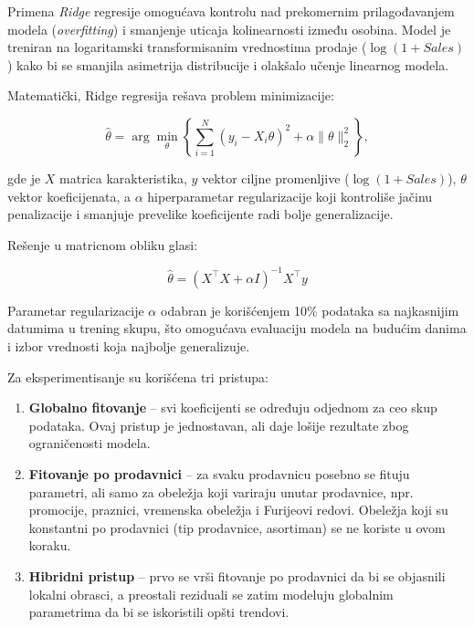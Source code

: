 \documentclass[12pt]{article}
\begin{document}
Primena \textit{Ridge} regresije omogućava kontrolu nad prekomernim prilagođavanjem modela (\textit{overfitting}) i smanjenje uticaja kolinearnosti između osobina.  
Model je treniran na logaritamski transformisanim vrednostima prodaje (\(\log(1+Sales)\)) kako bi se smanjila asimetrija distribucije i olakšalo učenje linearnog modela.  

Matematički, Ridge regresija rešava problem minimizacije:

\begin{equation}
    \hat{\theta} = \arg\min_\theta \left\{ \sum_{i=1}^{N} \left(y_i - X_i \theta \right)^2 + \alpha \|\theta\|_2^2 \right\},
\end{equation}

gde je \(X\) matrica karakteristika, \(y\) vektor ciljne promenljive (\(\log(1+Sales)\)), \(\theta\) vektor koeficijenata, a \(\alpha\) hiperparametar regularizacije koji kontroliše jačinu penalizacije i smanjuje prevelike koeficijente radi bolje generalizacije.

Rešenje u matricnom obliku glasi:

\begin{equation}
    \hat{\theta} = \left(X^\top X + \alpha I\right)^{-1} X^\top y
\end{equation}

Parametar regularizacije \(\alpha\) odabran je korišćenjem 10\% podataka sa najkasnijim datumima u trening skupu, što omogućava evaluaciju modela na budućim danima i izbor vrednosti koja najbolje generalizuje.

Za eksperimentisanje su korišćena tri pristupa:

\begin{enumerate}
    \item \textbf{Globalno fitovanje} – svi koeficijenti se određuju odjednom za ceo skup podataka. Ovaj pristup je jednostavan, ali daje lošije rezultate zbog ograničenosti modela.
    \item \textbf{Fitovanje po prodavnici} – za svaku prodavnicu posebno se fituju parametri, ali samo za obeležja koji variraju unutar prodavnice, npr. promocije, praznici, vremenska obeležja i Furijeovi redovi. Obeležja koji su konstantni po prodavnici (tip prodavnice, asortiman) se ne koriste u ovom koraku.
    \item \textbf{Hibridni pristup} – prvo se vrši fitovanje po prodavnici da bi se objasnili lokalni obrasci, a preostali reziduali se zatim modeluju globalnim parametrima da bi se iskoristili opšti trendovi.
\end{enumerate}
\end{document}

